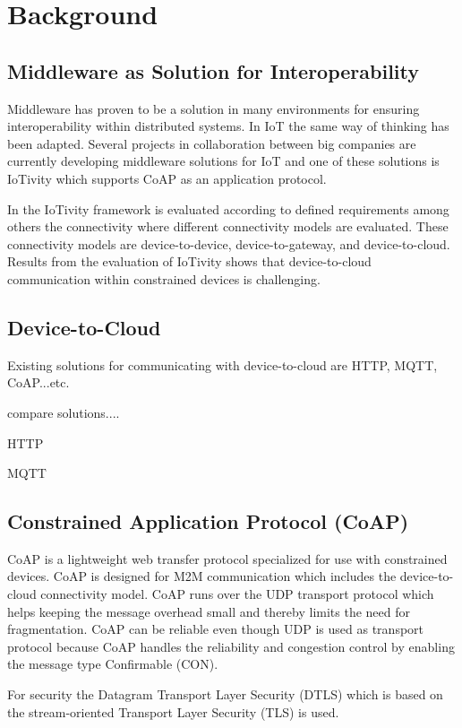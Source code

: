 \section{Background}




\subsection{Middleware as Solution for Interoperability}
Middleware has proven to be a solution in many environments for ensuring interoperability within distributed systems. In IoT the same way of thinking has been adapted. 
Several projects in collaboration between big companies are currently developing  middleware solutions for IoT and one of these solutions is IoTivity which supports CoAP as an application protocol.
 
In \cite{interoperabilityChallenge} the IoTivity framework is evaluated according to defined requirements among others the connectivity where different connectivity models are evaluated. These connectivity models are device-to-device, device-to-gateway, and device-to-cloud. Results from the evaluation of IoTivity shows that device-to-cloud communication within constrained devices is challenging.

\subsection{Device-to-Cloud}
Existing solutions for communicating with device-to-cloud are HTTP, MQTT, CoAP...etc.

compare solutions....


HTTP 

MQTT



\subsection{Constrained Application Protocol (CoAP)}
CoAP is a lightweight web transfer protocol specialized for use with constrained devices. CoAP is designed for M2M communication which includes the device-to-cloud connectivity model.
CoAP runs over the UDP transport protocol which helps keeping the message overhead small and thereby limits the need for fragmentation.
CoAP can be reliable even though UDP is used as transport protocol because CoAP handles the reliability and congestion control by enabling the message type Confirmable (CON).
 
For security the Datagram Transport Layer Security (DTLS) which is based on the stream-oriented Transport Layer Security (TLS) is used.
 
